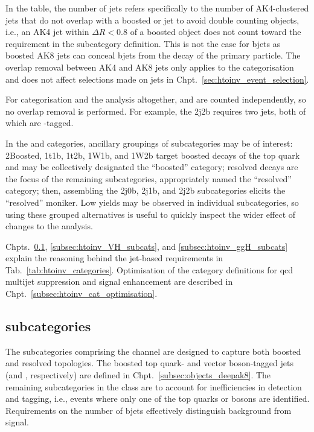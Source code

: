 In the table, the number of \glspl{jet} \njet refers specifically to the number of AK4-clustered \glspl{jet} that do not overlap with a boosted \Ptop or \PVec \gls{jet} to avoid double counting objects, i.e., an AK4 \gls{jet} within $\Delta R < \text{0.8}$ of a boosted object does not count toward the \njet requirement in the subcategory definition. This is not the case for \glspl{bjet} as boosted AK8 \glspl{jet} can conceal \glspl{bjet} from the decay of the primary particle. The overlap removal between AK4 and AK8 \glspl{jet} only applies to the categorisation and does not affect selections made on \glspl{jet} in Chpt.~\ref{sec:htoinv_event_selection}.

For categorisation and the analysis altogether, \njet and \nbjet are counted independently, so no overlap removal is performed. For example, the \VH 2j2b requires two \glspl{jet}, both of which are \Pbottom-tagged.

In the \ttH and \VH categories, ancillary groupings of subcategories may be of interest: 2Boosted, 1t1b, 1t2b, 1W1b, and 1W2b target boosted decays of the top quark and may be collectively designated the ``\ttH boosted'' category; resolved decays are the focus of the remaining subcategories, appropriately named the ``\ttH resolved'' category; then, assembling the 2j0b, 2j1b, and 2j2b \VH subcategories elicits the ``\VH resolved'' moniker. Low yields may be observed in individual subcategories, so using these grouped alternatives is useful to quickly inspect the wider effect of changes to the analysis.

Chpts.~\ref{subsec:htoinv_ttH_subcats}, \ref{subsec:htoinv_VH_subcats}, and \ref{subsec:htoinv_ggH_subcats} explain the reasoning behind the \gls{jet}-based requirements in Tab.~\ref{tab:htoinv_categories}. Optimisation of the category definitions for \acrshort{qcd} multijet suppression and signal enhancement are described in Chpt.~\ref{subsec:htoinv_cat_optimisation}.




\subsection{\texorpdfstring{\ttH}{ttH} subcategories}
\label{subsec:htoinv_ttH_subcats}

The subcategories comprising the \ttH channel are designed to capture both boosted and resolved topologies. The boosted top quark- and vector boson-tagged \glspl{jet} (\nBoostedTop and \nBoostedV, respectively) are defined in Chpt.~\ref{subsec:objects_deepak8}. The remaining subcategories in the class are to account for inefficiencies in detection and tagging, i.e., events where only one of the top quarks or \PW bosons are identified. Requirements on the number of \glspl{bjet} effectively distinguish background from signal.

